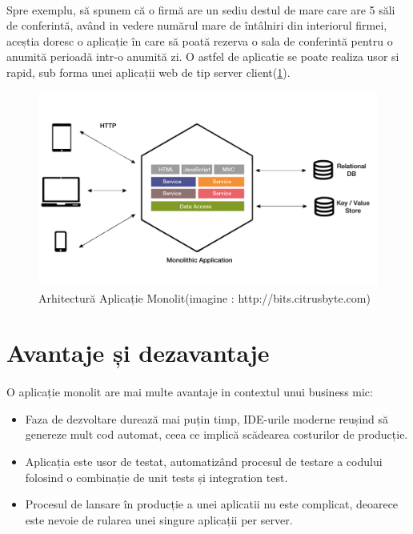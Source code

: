 \documentclass[12pt]{report}
\begin{document}
  	\paragraph{}Spre exemplu, să spunem că o firmă are un sediu destul de mare care are 5 săli de conferintă, având in vedere numărul mare de întâlniri din interiorul firmei, aceștia doresc o aplicație în care să poată rezerva o sala de conferintă pentru o anumită perioadă intr-o anumită zi. O astfel de aplicatie se poate realiza usor si rapid, sub forma unei aplicații web de tip server client(\ref{monolithicArhitecture}).
  	\begin{figure}[h]
  	\centering
  	\includegraphics[scale=.2]{monolitFigure}
	\caption{Arhitectură Aplicație Monolit(imagine : http://bits.citrusbyte.com)}  
	\label{monolithicArhitecture}
  	\end{figure}
  	\section{Avantaje și dezavantaje}
  	\paragraph{}O aplicație monolit are mai multe avantaje in contextul unui business mic:
  	
  	\begin{itemize}
  	\item Faza de dezvoltare durează mai puțin timp, IDE-urile moderne reușind să genereze mult cod automat, ceea ce implică scădearea costurilor de producție.
  	\item Aplicația este usor de testat, automatizând procesul de testare a codului folosind o combinație de unit tests și integration test. 
  	\item Procesul de lansare în producție a unei aplicatii nu este complicat, deoarece este nevoie de rularea unei singure aplicații per server.
  	\end{itemize}
\end{document}
